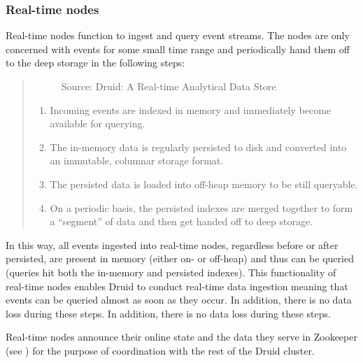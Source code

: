 \documentclass[letterpaper,10pt,english]{sphinxmanual}
\begin{document}
\subsubsection{Real-time nodes}
\label{\detokenize{discovery/part01/druid_nodes:real-time}}\label{\detokenize{discovery/part01/druid_nodes:realtime-nodes}}
Real-time nodes function to ingest and query event streams. The nodes are only concerned with events for some small time range and periodically hand them off to the deep storage in the following steps:
\begin{quote}

\begin{figure}[H]
\centering
\capstart

\noindent{}
\caption{Source: Druid: A Real-time Analytical Data Store}\label{\detokenize{discovery/part01/druid_nodes:id5}}\end{figure}
\begin{enumerate}
\def\theenumi{\arabic{enumi}}
\def\labelenumi{\theenumi .}
\makeatletter\def\p@enumii{\p@enumi \theenumi .}\makeatother
\item {} 
Incoming events are indexed in memory and immediately become available for querying.

\item {} 
The in-memory data is regularly persisted to disk and converted into an immutable, columnar storage format.

\item {} 
The persisted data is loaded into off-heap memory to be still queryable.

\item {} 
On a periodic basis, the persisted indexes are merged together to form a “segment” of data and then get handed off to deep storage.

\end{enumerate}
\end{quote}

In this way, all events ingested into real-time nodes, regardless before or after persisted, are present in memory (either on- or off-heap) and thus can be queried (queries hit both the in-memory and persisted indexes). This functionality of real-time nodes enables Druid to conduct real-time data ingestion meaning that events can be queried almost as soon as they occur. In addition, there is no data loss during these steps. In addition, there is no data loss during these steps.

Real-time nodes announce their online state and the data they serve in Zookeeper (see {\hyperref[\detokenize{discovery/part01/druid_nodes:external-dependencies}]{}}) for the purpose of coordination with the rest of the Druid cluster.
\end{document}
